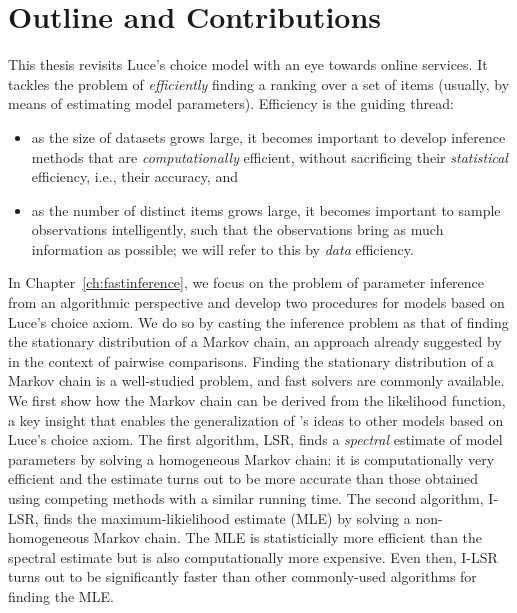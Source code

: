 \section{Outline and Contributions}
\label{in:sec:outline}

This thesis revisits Luce's choice model with an eye towards online services.
It tackles the problem of \emph{efficiently} finding a ranking over a set of items (usually, by means of estimating model parameters).
Efficiency is the guiding thread:
\begin{itemize}
\item as the size of datasets grows large, it becomes important to develop inference methods that are \emph{computationally} efficient, without sacrificing their \emph{statistical} efficiency, i.e., their accuracy, and
\item as the number of distinct items grows large, it becomes important to sample observations intelligently, such that the observations bring as much information as possible; we will refer to this by \emph{data} efficiency.
\end{itemize}

In Chapter~\ref{ch:fastinference}, we focus on the problem of parameter inference from an algorithmic perspective and develop two procedures for models based on Luce's choice axiom.
We do so by casting the inference problem as that of finding the stationary distribution of a Markov chain, an approach already suggested by~\citet{negahban2012iterative} in the context of pairwise comparisons.
Finding the stationary distribution of a Markov chain is a well-studied problem, and fast solvers are commonly available.
We first show how the Markov chain can be derived from the likelihood function, a key insight that enables the generalization of \citeauthor{negahban2012iterative}'s ideas to other models based on Luce's choice axiom.
The first algorithm, LSR, finds a \emph{spectral} estimate of model parameters by solving a homogeneous Markov chain: it is computationally very efficient and the estimate turns out to be more accurate than those obtained using competing methods with a similar running time.
The second algorithm, I-LSR, finds the maximum-likielihood estimate (MLE) by solving a non-homogeneous Markov chain.
The MLE is statisticially more efficient than the spectral estimate but is also computationally more expensive.
Even then, I-LSR turns out to be significantly faster than other commonly-used algorithms for finding the MLE.

